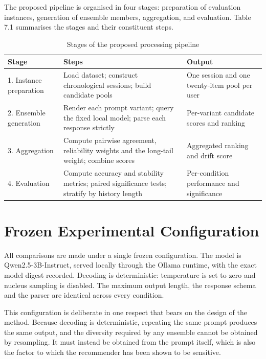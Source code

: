 \documentclass[12pt,a4paper,oneside]{report}
\begin{document}
The proposed pipeline is organised in four stages: preparation of evaluation
instances, generation of ensemble members, aggregation, and evaluation. Table
7.1 summarises the stages and their constituent steps.

\begin{table}[h]
\centering
\small
\caption{Stages of the proposed processing pipeline}
\begin{tabularx}{\textwidth}{@{}p{3.0cm}XX@{}}
\toprule
\textbf{Stage} & \textbf{Steps} & \textbf{Output}\\
\midrule
1. Instance preparation & Load dataset; construct chronological sessions;
build candidate pools & One session and one twenty-item pool per user\\[4pt]

2. Ensemble generation & Render each prompt variant; query the fixed local model;
parse each response strictly & Per-variant candidate scores and ranking\\[4pt]

3. Aggregation & Compute pairwise agreement, reliability weights and the
long-tail weight; combine scores & Aggregated ranking and drift score\\[4pt]

4. Evaluation & Compute accuracy and stability metrics; paired significance
tests; stratify by history length & Per-condition performance and significance\\
\bottomrule
\end{tabularx}
\end{table}

\section{Frozen Experimental Configuration}

All comparisons are made under a single frozen configuration. The model is
Qwen2.5-3B-Instruct, served locally through the Ollama runtime, with the exact
model digest recorded. Decoding is deterministic: temperature is set to zero and
nucleus sampling is disabled. The maximum output length, the response schema and
the parser are identical across every condition.

This configuration is deliberate in one respect that bears on the design of the
method. Because decoding is deterministic, repeating the same prompt produces the
same output, and the diversity required by any ensemble cannot be obtained by
resampling. It must instead be obtained from the prompt itself, which is also the
factor to which the recommender has been shown to be sensitive.
\end{document}
